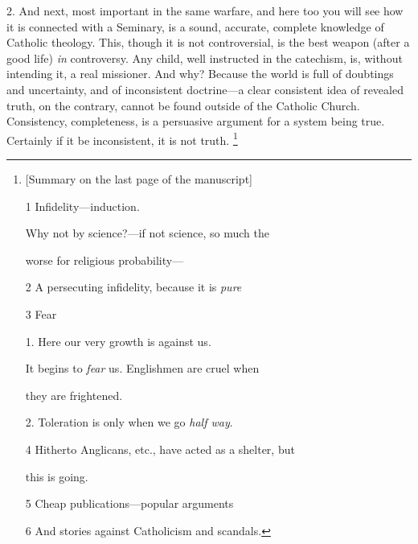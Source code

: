 2. And next, most important in the same warfare,
and here too you will see how it is connected with a Seminary,
is a sound, accurate, complete knowledge of Catholic theology. This,
though it is not controversial, is the best weapon (after a good life)
\emph{in} controversy. Any child, well instructed in the catechism,
is, without intending it, a real missioner. And why? Because the world
is full of doubtings and uncertainty, and of inconsistent doctrine—a
clear consistent idea of revealed truth, on the contrary, cannot be
found outside of the Catholic Church. Consistency, completeness, is a
persuasive argument for a system being true. Certainly if it be
inconsistent, it is not truth. \footnote{[Summary on the last page
of the manuscript]

1
Infidelity—induction.

Why not by
science?—if not science, so much the

worse for
religious probability—

2 A persecuting
infidelity, because it is \emph{pure}

3 Fear

1. Here our
very growth is against us.

It begins to \emph{fear} us. Englishmen are cruel when

they are frightened.

2.
Toleration is only when we go \emph{half way}.

4 Hitherto Anglicans,
etc., have acted as a shelter, but

this is
going.

5 Cheap
publications—popular arguments

6 And stories against
Catholicism and scandals.}

